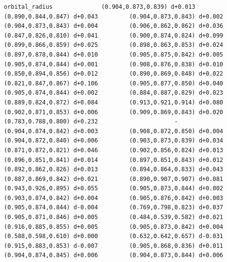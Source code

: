 \documentclass[11pt, letterpaper, openany]{book}
\begin{document}
\begin{empiricalbox}
\begin{lstlisting}[style=terminal]
orbital_radius              (0.904,0.873,0.839) d+0.013         (0.890,0.844,0.847) d+0.043         (0.904,0.873,0.843) d+0.002         (0.904,0.873,0.843) d+0.004         (0.906,0.862,0.862) d+0.036         (0.847,0.826,0.810) d+0.041         (0.900,0.874,0.824) d+0.099         (0.899,0.866,0.859) d+0.025         (0.898,0.863,0.853) d+0.024         (0.897,0.878,0.844) d+0.010         (0.905,0.875,0.842) d+0.005         (0.905,0.874,0.844) d+0.001         (0.908,0.876,0.838) d+0.010         (0.850,0.894,0.856) d+0.012         (0.890,0.869,0.848) d+0.022         (0.821,0.847,0.867) d+0.106         (0.905,0.877,0.850) d+0.040         (0.905,0.874,0.844) d+0.002         (0.884,0.887,0.829) d+0.023         (0.889,0.824,0.872) d+0.084         (0.913,0.921,0.914) d+0.080         (0.902,0.871,0.853) d+0.006         (0.909,0.869,0.843) d+0.020         (0.783,0.788,0.800) d+0.232                      -                      (0.904,0.874,0.842) d+0.003         (0.908,0.872,0.850) d+0.004         (0.904,0.872,0.840) d+0.006         (0.903,0.873,0.839) d+0.034         (0.871,0.872,0.821) d+0.046         (0.902,0.856,0.824) d+0.013         (0.896,0.851,0.841) d+0.014         (0.897,0.851,0.843) d+0.012         (0.892,0.862,0.826) d+0.013         (0.894,0.864,0.833) d+0.043         (0.887,0.869,0.842) d+0.021         (0.890,0.907,0.907) d+0.081         (0.943,0.926,0.895) d+0.055         (0.905,0.873,0.844) d+0.002         (0.903,0.874,0.842) d+0.004         (0.905,0.876,0.842) d+0.003         (0.905,0.874,0.844) d-0.004         (0.769,0.798,0.823) d+0.037         (0.905,0.871,0.846) d+0.005         (0.484,0.539,0.582) d+0.021         (0.916,0.885,0.855) d+0.005         (0.905,0.873,0.842) d+0.004         (0.588,0.598,0.610) d+0.000         (0.632,0.642,0.657) d-0.031         (0.915,0.883,0.853) d-0.007         (0.905,0.868,0.836) d+0.011         (0.904,0.874,0.845) d+0.006         (0.904,0.873,0.844) d+0.006     

\end{lstlisting}
\end{empiricalbox}
\end{document}
